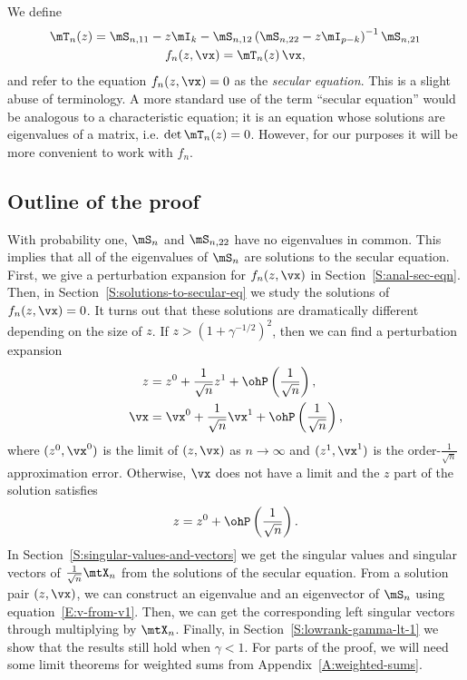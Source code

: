 We define
\begin{gather}
    \mT_n(z)
        =
            \mS_{n,11}
            -
            z
            \mI_k
            -
            \mS_{n,12}
            \left(
                \mS_{n,22}
                -
                z
                \mI_{p-k}
            \right)^{-1}
            \mS_{n,21}
            \label{E:secular-T} \\
    f_n ( z, \vx )
        =
            \mT_n(z) \,
            \vx, \label{E:secular-f}
\end{gather}
and refer to the equation $f_n(z, \vx) = 0$ as the \emph{secular equation}.  This
is a slight abuse of terminology.  A more standard use of the term ``secular equation'' would be analogous to a characteristic equation; it is an equation whose solutions are eigenvalues of a matrix, i.e. $\det \mT_n(z) = 0$.  However, for our purposes it will be more convenient to work with $f_n$.

\subsection{Outline of the proof}

With probability one, $\mS_n$ and $\mS_{n,22}$ have no eigenvalues in common.  This implies that all of the eigenvalues of $\mS_n$ are solutions to the secular equation.  First, we give a perturbation expansion for $f_n(z, \vx)$ in Section~\ref{S:anal-sec-eqn}.  Then, in Section~\ref{S:solutions-to-secular-eq} we study the solutions of  $f_n(z, \vx) = 0$.  It turns out that these solutions are dramatically different depending on the size of $z$.  If $z > (1 + \gamma^{-1/2})^2$, then we can find a perturbation expansion
\begin{align*}
    z 
        &= 
            z^0 
            + 
            \frac{1}{\sqrt{n}}
            z^1 
            + 
            \ohP\left( \frac{1}{\sqrt{n}} \right), \\
    \vx
        &=
            \vx^0
            +
            \frac{1}{\sqrt{n}}
            \vx^1
            + 
            \ohP\left( \frac{1}{\sqrt{n}} \right),
\end{align*}
where $(z^0, \vx^0)$ is the limit of $(z, \vx)$ as $n\to \infty$ and
$(z^1, \vx^1)$ is the order-$\frac{1}{\sqrt{n}}$ approximation error.
Otherwise, $\vx$ does not have a limit and the $z$ part of the solution 
satisfies
\[
    z
        =
            z^0
            + 
            \ohP\left( \frac{1}{\sqrt{n}} \right).
\]
In Section~\ref{S:singular-values-and-vectors} we get the singular values and singular vectors of $\frac{1}{\sqrt{n}} \mtX_n$ from the solutions of the secular equation.  From a solution pair $(z, \vx)$, we can construct an eigenvalue and an eigenvector of $\mS_n$ using equation~\eqref{E:v-from-v1}.  Then, we can get the corresponding left singular vectors through multiplying by $\mtX_n$.  Finally, in Section~\ref{S:lowrank-gamma-lt-1} we show that the results still hold when $\gamma < 1$.  For parts of the proof, we will need some limit theorems for weighted sums from Appendix~\ref{A:weighted-sums}.

